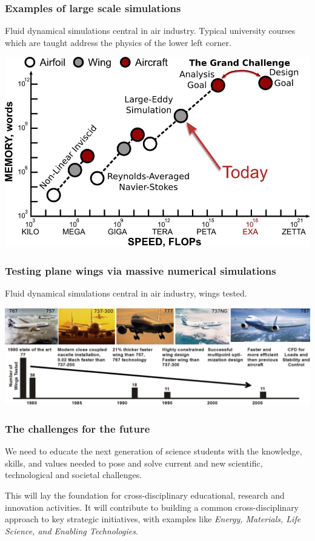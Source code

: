 \documentclass{beamer}
\begin{document}
\begin{frame}
\frametitle{Examples of large scale simulations}

\begin{block}{Fluid dynamical simulations central in air industry.  Typical university courses which are taught address the physics of the lower left corner.  }


\centerline{\includegraphics[width=0.6\linewidth]{fig-future/fig10.jpg}}


\end{block}
\end{frame}

\begin{frame}
\frametitle{Testing plane wings via massive numerical simulations}

\begin{block}{}
Fluid dynamical simulations central in air industry, wings tested.


\centerline{\includegraphics[width=1.0\linewidth]{fig-future/fig8.jpg}}


\end{block}
\end{frame}

\begin{frame}
\frametitle{The challenges for the future}

\begin{block}{}
We need to educate the next generation of 
science students with the knowledge, skills, and values needed to pose
and solve current and new scientific, technological and societal
challenges. 
\end{block}
\begin{block}{}
This will lay the foundation for cross-disciplinary
educational, research and innovation activities. It will contribute to building a common cross-disciplinary
approach to key strategic initiatives, with examples like \emph{Energy, Materials, Life Science, and Enabling Technologies}. 
\end{block}
\end{frame}
\end{document}
